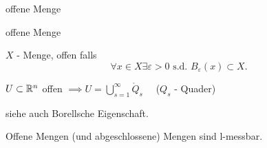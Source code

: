 \documentclass[class=article, crop=false]{standalone}
\begin{document}
\begin{zettel}{offene Menge}
\begin{flashcard}[085f6h79]{offene Menge}
	\begin{definition}[offen]
		$X$ - Menge, offen falls
		\[
			\forall x \in  X \exists \varepsilon > 0 \text{ s.d. } B_\varepsilon(x) \subset X
		.\]
	\end{definition}
\end{flashcard}

\begin{theorem}
	$U \subset \mathbb{R}^n$ offen $\implies U = \bigcup_{s = 1}^{\infty} \mathring{Q}_s$ \ \ ($Q_s$ - Quader)
\end{theorem}
siehe auch Borellsche Eigenschaft.

\begin{corollary}
	Offene Mengen (und abgeschlossene) Mengen sind l-messbar.
\end{corollary}

\end{zettel}
\end{document}
